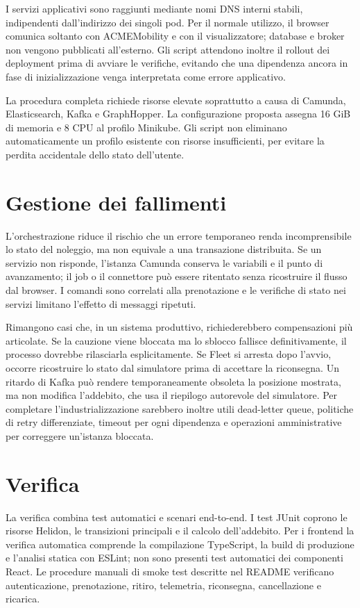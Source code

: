\documentclass[12pt,a4paper,twoside]{report}
\begin{document}
I servizi applicativi sono raggiunti mediante nomi DNS interni stabili,
indipendenti dall'indirizzo dei singoli pod. Per il normale utilizzo, il
browser comunica soltanto con ACMEMobility e con il visualizzatore; database
e broker non vengono pubblicati all'esterno. Gli script attendono inoltre il rollout
dei deployment prima di avviare le verifiche, evitando che una dipendenza
ancora in fase di inizializzazione venga interpretata come errore
applicativo.

La procedura completa richiede risorse elevate soprattutto a causa di
Camunda, Elasticsearch, Kafka e GraphHopper. La configurazione proposta
assegna 16 GiB di memoria e 8 CPU al profilo Minikube. Gli script non
eliminano automaticamente un profilo esistente con risorse insufficienti,
per evitare la perdita accidentale dello stato dell'utente.

\section{Gestione dei fallimenti}

L'orchestrazione riduce il rischio che un errore temporaneo renda
incomprensibile lo stato del noleggio, ma non equivale a una transazione
distribuita. Se un servizio non risponde, l'istanza Camunda conserva le
variabili e il punto di avanzamento; il job o il connettore può essere
ritentato senza ricostruire il flusso dal browser. I comandi sono correlati
alla prenotazione e le verifiche di stato nei servizi limitano l'effetto di
messaggi ripetuti.

Rimangono casi che, in un sistema produttivo, richiederebbero compensazioni
più articolate. Se la cauzione viene bloccata ma lo sblocco fallisce
definitivamente, il processo dovrebbe rilasciarla esplicitamente. Se Fleet si
arresta dopo l'avvio, occorre ricostruire lo stato dal simulatore prima di
accettare la riconsegna. Un ritardo di Kafka può rendere temporaneamente
obsoleta la posizione mostrata, ma non modifica l'addebito, che usa il
riepilogo autorevole del simulatore. Per completare l'industrializzazione
sarebbero inoltre utili dead-letter queue, politiche di retry differenziate,
timeout per ogni dipendenza e operazioni amministrative per correggere
un'istanza bloccata.

\section{Verifica}

La verifica combina test automatici e scenari end-to-end. I test JUnit
coprono le risorse Helidon, le transizioni principali e il calcolo
dell'addebito. Per i frontend la verifica automatica comprende la compilazione
TypeScript, la build di produzione e l'analisi statica con ESLint; non sono
presenti test automatici dei componenti React. Le procedure manuali di smoke
test descritte nel README verificano autenticazione, prenotazione, ritiro,
telemetria, riconsegna, cancellazione e ricarica.
\end{document}
